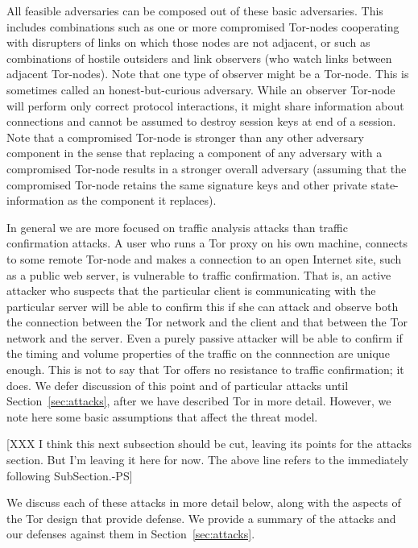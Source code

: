 \documentclass[times,10pt,twocolumn]{article}
\begin{document}
All feasible adversaries can be composed out of these basic
adversaries. This includes combinations such as one or more
compromised Tor-nodes cooperating with disrupters of links on which
those nodes are not adjacent, or such as combinations of hostile
outsiders and link observers (who watch links between adjacent
Tor-nodes).  Note that one type of observer might be a Tor-node. This
is sometimes called an honest-but-curious adversary. While an observer
Tor-node will perform only correct protocol interactions, it might
share information about connections and cannot be assumed to destroy
session keys at end of a session.  Note that a compromised Tor-node is
stronger than any other adversary component in the sense that
replacing a component of any adversary with a compromised Tor-node
results in a stronger overall adversary (assuming that the compromised
Tor-node retains the same signature keys and other private
state-information as the component it replaces).


In general we are more focused on traffic analysis attacks than
traffic confirmation attacks. A user who runs a Tor proxy on his own
machine, connects to some remote Tor-node and makes a connection to an
open Internet site, such as a public web server, is vulnerable to
traffic confirmation. That is, an active attacker who suspects that
the particular client is communicating with the particular server will
be able to confirm this if she can attack and observe both the
connection between the Tor network and the client and that between the
Tor network and the server. Even a purely passive attacker will be
able to confirm if the timing and volume properties of the traffic on
the connnection are unique enough.  This is not to say that Tor offers
no resistance to traffic confirmation; it does.  We defer discussion
of this point and of particular attacks until Section~\ref{sec:attacks},
after we have described Tor in more detail. However, we note here some
basic assumptions that affect the threat model.

[XXX I think this next subsection should be cut, leaving its points
for the attacks section. But I'm leaving it here for now. The above
line refers to the immediately following SubSection.-PS]


\label{subsec:known-attacks}

We discuss each of these attacks in more detail below, along with the
aspects of the Tor design that provide defense. We provide a summary
of the attacks and our defenses against them in Section~\ref{sec:attacks}.
\end{document}
